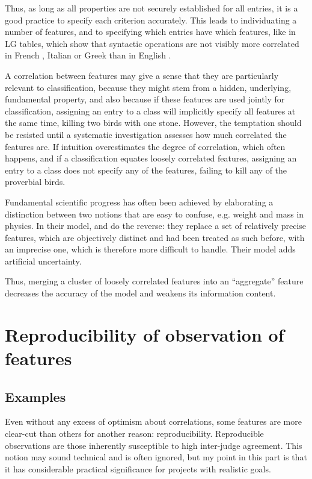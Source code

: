 \documentclass[output=paper]{langsci/langscibook}
\begin{document}
Thus, as long as all properties are not securely established for all entries, it is a good practice to specify each criterion accurately. This leads to individuating a number of features, and to specifying which entries have which features, like in LG tables, which show that syntactic operations are not visibly more correlated in French \citep{gross1982}, Italian \citep{Vietri2011} or Greek \citep{fotopoulou1993} than in English \citep{Freckleton1985}.

A correlation between features may give a sense that they are particularly relevant to classification, because they might stem from a hidden, underlying, fundamental property, and also because if these features are used jointly for classification, assigning an entry to a class will implicitly specify all features at the same time, killing two birds with one stone. However, the temptation should be resisted until a systematic investigation assesses how much correlated the features are. If intuition overestimates the degree of correlation, which often happens, and if a classification equates loosely correlated features, assigning an entry to a class does not specify any of the features, failing to kill any of the proverbial birds.

Fundamental scientific progress has often been achieved by elaborating a distinction between two notions that are easy to confuse, e.g. weight and mass in physics. In their model, \cite{Sag:2002}  and \citet{Baldwin2010} do the reverse: they replace a set of relatively precise features, which are objectively distinct and had been treated as such before, with an imprecise one, which is therefore more difficult to handle. Their model adds artificial uncertainty.

Thus, merging a cluster of loosely correlated features into an “aggregate” feature decreases the accuracy of the model and weakens its information content.

\section{Reproducibility of observation of features}
\label{sec:4}

\subsection{Examples} 

Even without any excess of optimism about correlations, some features are more clear-cut than others for another reason: reproducibility. Reproducible observations are those inherently susceptible to high inter-judge agreement. This notion may sound technical and is often ignored, but my point in this part is that it has considerable practical significance for projects with realistic goals.
\end{document}
